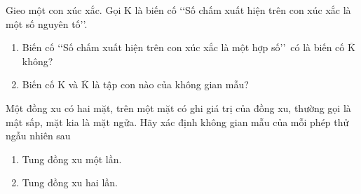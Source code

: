 \begin{vd}%
	Gieo một con xúc xắc. Gọi $ \mathrm{K} $ là biến cố \lq\lq Số chấm xuất hiện trên con xúc xắc là một số nguyên tố\rq\rq.
	\begin{enumerate}
		\item Biến cố \lq\lq Số chấm xuất hiện trên con xúc xắc là một hợp số\rq\rq\, có là biến cố $\mathrm{\overline{K}}$ không?
		\item Biến cố $ \mathrm{K} $ và $\mathrm{\overline{K}}$ là tập con nào của không gian mẫu?
	\end{enumerate}
\end{vd}
\begin{vd}%
	Một đồng xu có hai mặt, trên một mặt có ghi giá trị của đồng xu, thường gọi là mật sấp, mặt kia là mặt ngửa. Hãy xác định không gian mẫu của mỗi phép thử ngẫu nhiên sau
	\begin{enumerate}
		\item Tung đồng xu một lần.
		\item Tung đồng xu hai lần.
	\end{enumerate}
\end{vd}

